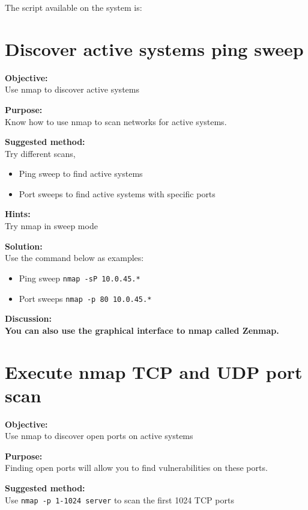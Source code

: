 \documentclass[a4paper,11pt,notitlepage]{report}
\begin{document}
The script available on the system is:
{\small
{}
}



\chapter{Discover active systems ping sweep}
\label{ex:nmap-pingsweep}

{\bf Objective:}\\
Use nmap to discover active systems

{\bf Purpose:}\\
Know how to use nmap to scan networks for active systems.

{\bf Suggested method:}\\
Try different scans,
\begin{itemize}
\item Ping sweep to find active systems
\item Port sweeps to find active systems with specific ports
\end{itemize}

{\bf Hints:} \\
Try nmap in sweep mode

{\bf Solution:}\\
Use the command below as examples:
\begin{itemize}
\item Ping sweep \verb+nmap -sP 10.0.45.*+
\item Port sweeps \verb+nmap -p 80 10.0.45.*+
\end{itemize}

{\bf Discussion:}\\

{\bf You can also use the graphical interface to nmap called Zenmap.}


\chapter{Execute nmap TCP and UDP port scan}
\label{ex:nmap-synscan}


{\bf Objective:} \\
Use nmap to discover open ports on active systems

{\bf Purpose:}\\
Finding open ports will allow you to find vulnerabilities on these ports.

{\bf Suggested method:}\\
Use \verb+nmap -p 1-1024 server+ to scan the first 1024 TCP
ports
\end{document}
